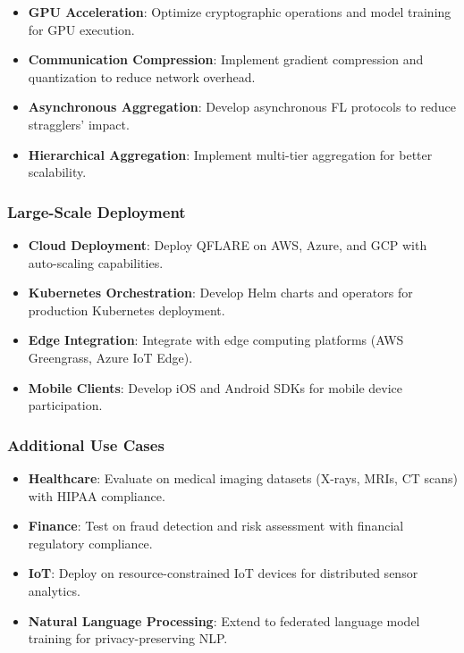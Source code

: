\documentclass[12pt,a4paper]{article}
\begin{document}
\begin{itemize}
    \item \textbf{GPU Acceleration}: Optimize cryptographic operations and model training for GPU execution.
    \item \textbf{Communication Compression}: Implement gradient compression and quantization to reduce network overhead.
    \item \textbf{Asynchronous Aggregation}: Develop asynchronous FL protocols to reduce stragglers' impact.
    \item \textbf{Hierarchical Aggregation}: Implement multi-tier aggregation for better scalability.
\end{itemize}

\subsubsection{Large-Scale Deployment}

\begin{itemize}
    \item \textbf{Cloud Deployment}: Deploy QFLARE on AWS, Azure, and GCP with auto-scaling capabilities.
    \item \textbf{Kubernetes Orchestration}: Develop Helm charts and operators for production Kubernetes deployment.
    \item \textbf{Edge Integration}: Integrate with edge computing platforms (AWS Greengrass, Azure IoT Edge).
    \item \textbf{Mobile Clients}: Develop iOS and Android SDKs for mobile device participation.
\end{itemize}

\subsubsection{Additional Use Cases}

\begin{itemize}
    \item \textbf{Healthcare}: Evaluate on medical imaging datasets (X-rays, MRIs, CT scans) with HIPAA compliance.
    \item \textbf{Finance}: Test on fraud detection and risk assessment with financial regulatory compliance.
    \item \textbf{IoT}: Deploy on resource-constrained IoT devices for distributed sensor analytics.
    \item \textbf{Natural Language Processing}: Extend to federated language model training for privacy-preserving NLP.
\end{itemize}
\end{document}
